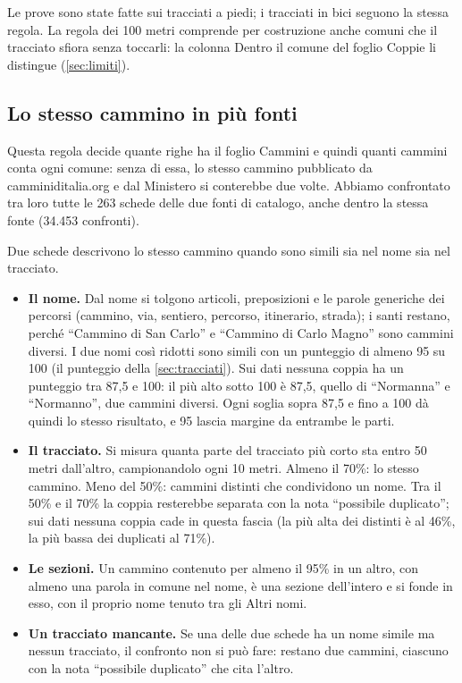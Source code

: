 Le prove sono state fatte sui tracciati a piedi; i tracciati in bici seguono la stessa regola. La regola dei 100 metri comprende per costruzione anche comuni che il tracciato sfiora senza toccarli: la colonna Dentro il comune del foglio Coppie li distingue (\cref{sec:limiti}).

\FloatBarrier

\subsection{Lo stesso cammino in più fonti}\label{sec:dedup}

Questa regola decide quante righe ha il foglio Cammini e quindi quanti cammini conta ogni comune: senza di essa, lo stesso cammino pubblicato da camminiditalia.org e dal Ministero si conterebbe due volte. Abbiamo confrontato tra loro tutte le 263 schede delle due fonti di catalogo, anche dentro la stessa fonte (34.453 confronti).

Due schede descrivono lo stesso cammino quando sono simili sia nel nome sia nel tracciato.

\begin{itemize}
\item \textbf{Il nome.} Dal nome si tolgono articoli, preposizioni e le parole generiche dei percorsi (cammino, via, sentiero, percorso, itinerario, strada); i santi restano, perché “Cammino di San Carlo” e “Cammino di Carlo Magno” sono cammini diversi. I due nomi così ridotti sono simili con un punteggio di almeno 95 su 100 (il punteggio della \cref{sec:tracciati}). Sui dati nessuna coppia ha un punteggio tra 87,5 e 100: il più alto sotto 100 è 87,5, quello di “Normanna” e “Normanno”, due cammini diversi. Ogni soglia sopra 87,5 e fino a 100 dà quindi lo stesso risultato, e 95 lascia margine da entrambe le parti.
\item \textbf{Il tracciato.} Si misura quanta parte del tracciato più corto sta entro 50 metri dall'altro, campionandolo ogni 10 metri. Almeno il 70\%: lo stesso cammino. Meno del 50\%: cammini distinti che condividono un nome. Tra il 50\% e il 70\% la coppia resterebbe separata con la nota “possibile duplicato”; sui dati nessuna coppia cade in questa fascia (la più alta dei distinti è al 46\%, la più bassa dei duplicati al 71\%).
\item \textbf{Le sezioni.} Un cammino contenuto per almeno il 95\% in un altro, con almeno una parola in comune nel nome, è una sezione dell'intero e si fonde in esso, con il proprio nome tenuto tra gli Altri nomi.
\item \textbf{Un tracciato mancante.} Se una delle due schede ha un nome simile ma nessun tracciato, il confronto non si può fare: restano due cammini, ciascuno con la nota “possibile duplicato” che cita l'altro.
\end{itemize}

